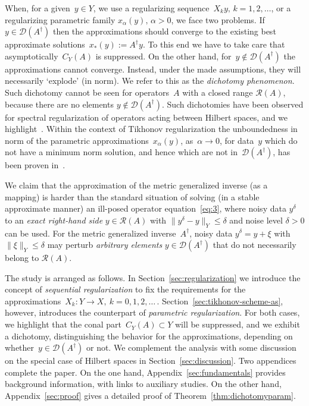 \documentclass[12pt]{amsart}
\newcommand{\domain}{\mathcal D}
\newcommand{\range}{\mathcal R}
\newcommand{\Ad}{A^\dag}
\newcommand{\xast}{x_\ast}
\theoremstyle{remark}
\begin{document}
When, for a given~$y\in Y$, we use a regularizing sequence~$X_{k}y,\,k=1,2,\dots$, 
or a regularizing parametric family $x_\alpha(y),\,\alpha>0$, we 
face two problems. If~$y\in\domain(\Ad)$ then the approximations should converge to the existing best approximate solutions~$\xast(y):= \Ad y$. To this end
 we have to take care that asymptotically~$C_{Y}(A)$ is suppressed. On the other hand, for~$y\not\in\domain(\Ad)$ the approximations cannot converge. Instead, under the made assumptions, they will necessarily `explode' (in norm). We refer to this as the \emph{dichotomy phenomenon}. Such dichotomy cannot be seen for operators~$A$ with a closed range $\range(A)$, because there are no elements $y \notin \domain(\Ad)$. Such dichotomies have been observed for spectral regularization of operators acting between Hilbert spaces, and we highlight~\cite[Thm.~5.2]{MR859375}. Within the context of Tikhonov regularization the unboundedness in norm of the parametric approximations~$x_\alpha(y)$, as~$\alpha\to 0$, for data~$y$ which do not have a minimum norm solution, and hence which are not in~$\domain(\Ad)$, has been proven in~\cite[Prop.~3.2]{Binder94}.

\par

We claim that the approximation of the metric generalized inverse (as a mapping) is
harder than the standard situation of solving (in a stable approximate manner) an ill-posed operator equation~\eqref{eq:3}, 
where noisy data $y^{\delta}$ to an \emph{exact right-hand side} $y \in \range(A)$ with $\|y^\delta-y\|_Y\le \delta$ and noise level $\delta>0$ can be used. For the metric generalized inverse~$\Ad$, noisy data $y^{\delta}=y+\xi$
with $\|\xi\|_Y \le \delta$ may perturb \emph{arbitrary elements} $y \in \domain(\Ad)$ that do not necessarily belong to $\range(A)$.
\smallskip

  The study is arranged as follows. In
  Section~\ref{sec:regularization} we introduce the concept of
  \emph{sequential regularization} to fix the requirements for the
  approximations~$X_{k}\colon Y \to X,\ k=0,1,2,\dotsc\,.$
  Section~\ref{sec:tikhonov-scheme-as}, however, introduces the counterpart of \emph{parametric regularization}.
   For both cases, we highlight that the conal part~$C_{Y}(A)\subset Y$
  will be suppressed, and we exhibit a dichotomy, distinguishing the
  behavior for the approximations, depending on
  whether~$y\in\domain(\Ad)$ or not.
  We complement the analysis with some discussion on the special case of Hilbert spaces in Section~\ref{sec:discussion}. Two appendices complete the paper. On the one hand, Appendix~\ref{sec:fundamentals} provides background information, with links to auxiliary studies. On the other hand, Appendix~\ref{sec:proof} gives a detailed proof of  Theorem~\ref{thm:dichotomyparam}.
\end{document}

